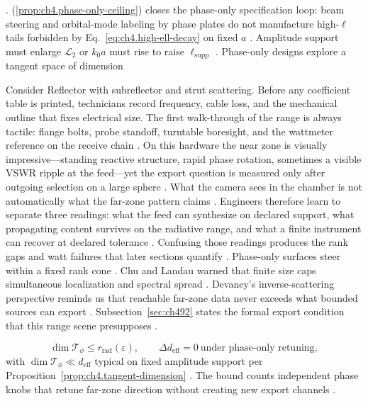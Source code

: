 \cite{hansen1988}.
(\ref{prop:ch4.phase-only-ceiling}) closes the phase-only specification loop: beam steering and orbital-mode labeling by phase plates do not manufacture
high-\(\ell\) tails forbidden by Eq.~\eqref{eq:ch4.high-ell-decay} on fixed \(a\) \cite{hansen1988}. Amplitude support must
enlarge \(\mathcal{L}_{2}\) or \(k_{0}a\) must rise to raise \(\ell_{\mathrm{supp}}\) \cite{stratton1941}.
Phase-only designs explore a tangent space of dimension
\begin{physicalvignette}
Consider Reflector with subreflector and strut scattering. Before any coefficient table is printed, technicians record frequency, cable loss, and the mechanical outline that fixes electrical size. The first walk-through of the range is always tactile: flange bolts, probe standoff, turntable boresight, and the wattmeter reference on the receive chain \cite{hansen1988}.
On this hardware the near zone is visually impressive---standing reactive structure, rapid phase rotation, sometimes a visible VSWR ripple at the feed---yet the export question is measured only after outgoing selection on a large sphere \cite{harrington2001}. What the camera sees in the chamber is not automatically what the far-zone pattern claims \cite{stratton1941}.
Engineers therefore learn to separate three readings: what the feed can synthesize on declared support, what propagating content survives on the radiative range, and what a finite instrument can recover at declared tolerance \cite{devaney2004}. Confusing those readings produces the rank gaps and watt failures that later sections quantify \cite{pal2026}.
Phase-only surfaces steer within a fixed rank cone . 
Chu and Landau warned that finite size caps simultaneous localization and spectral spread \cite{chu1948}. Devaney's inverse-scattering perspective reminds us that reachable far-zone data never exceeds what bounded sources can export \cite{devaney2004}.
Subsection~\ref{sec:ch492} states the formal export condition that this range scene presupposes \cite{stratton1941}.
\end{physicalvignette}
\begin{equation}
\label{eq:ch4.phase-tangent-bound}
\dim\mathcal{T}_{\phi}\le r_{\mathrm{rad}}(\varepsilon),\qquad
\Delta d_{\mathrm{eff}}=0\ \text{under phase-only retuning},
\end{equation}
with \(\dim\mathcal{T}_{\phi}\ll d_{\mathrm{eff}}\) typical on fixed amplitude support per Proposition~\ref{prop:ch4.tangent-dimension}
\cite{stratton1941}. The bound counts independent phase knobs that retune far-zone direction without creating new export channels \cite{collin2001}.
